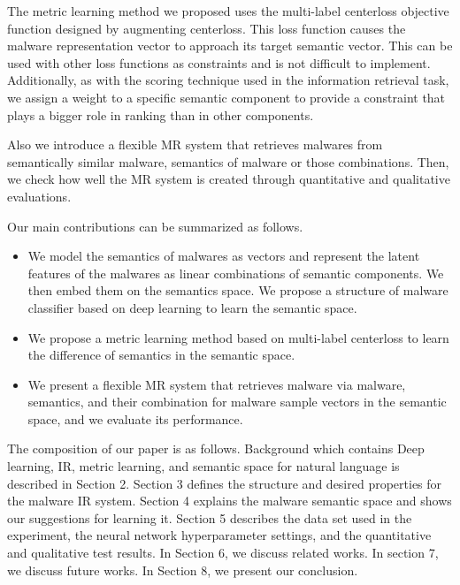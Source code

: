 The metric learning method we proposed uses the multi-label centerloss objective function designed by augmenting centerloss\cite{wen2016discriminative}. This loss function causes the malware representation vector to approach its target semantic vector. This can be used with other loss functions as constraints and is not difficult to implement. Additionally, as with the scoring technique used in the information retrieval task, we assign a weight to a specific semantic component to provide a constraint that plays a bigger role in ranking than in other components.

Also we introduce a flexible MR system that retrieves malwares from semantically similar malware, semantics of malware or those combinations. Then, we check how well the MR system is created through quantitative and qualitative evaluations.

Our main contributions can be summarized as follows.

\begin{itemize}
\item We model the semantics of malwares as vectors and represent the latent features of the malwares as linear combinations of semantic components. We then embed them on the semantics space. We propose a structure of malware classifier based on deep learning to learn the semantic space.
\item We propose a metric learning method based on multi-label centerloss to learn the difference of semantics in the semantic space.
\item We present a flexible MR system that retrieves malware via malware, semantics, and their combination for malware sample vectors in the semantic space, and we evaluate its performance.
\end{itemize}

The composition of our paper is as follows. Background which contains Deep learning, IR, metric learning, and semantic space for natural language is described in Section 2. Section 3 defines the structure and desired properties for the malware IR system. Section 4 explains the malware semantic space and shows our suggestions for learning it. Section 5 describes the data set used in the experiment, the neural network hyperparameter settings, and the quantitative and qualitative test results. In Section 6, we discuss related works. In section 7, we discuss future works. In Section 8, we present our conclusion.









